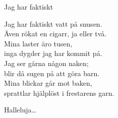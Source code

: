 \begin{song}{Jag har faktiskt}
	
	
	
	Jag har faktiskt vatt på snusen.\\
	Även rökat en cigarr, ja eller två.\\
	Mina laster äro tusen,\\
	inga dygder jag har kommit på.\\
	Jag ser gärna någon naken;\\
	blir då sugen på att göra barn.\\
	Mina blickar går mot baken,\\
	sprattlar hjälplöst i frestarens garn.
	
	Halleluja\ldots{}
	
\end{song}
